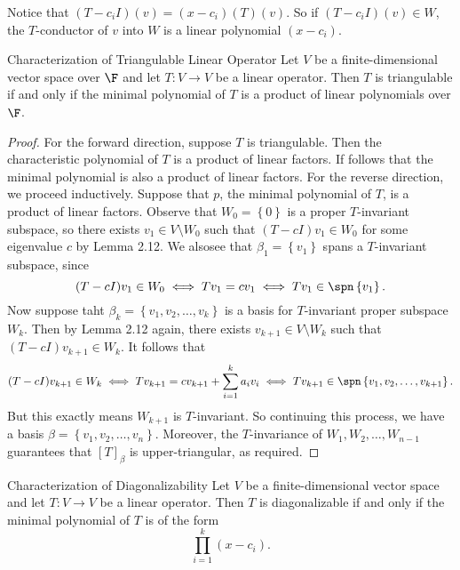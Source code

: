 \documentclass[math_245.tex]{subfiles}
\begin{document}
    \begin{remark}
        Notice that $(T-c_iI)(v) = (x-c_i)(T)(v)$. So if $(T-c_iI)(v)\in W$, the $T$-conductor of $v$ into $W$ is a linear polynomial $(x-c_i)$.
    \end{remark}

    \begin{theorem}{Characterization of Triangulable Linear Operator}
        Let $V$ be a finite-dimensional vector space over $\F$ and let $T:V\to V$ be a linear operator. Then $T$ is triangulable if and only if the minimal polynomial of $T$ is a product of linear polynomials over $\F$.
    \end{theorem}

    \begin{proof}
        For the forward direction, suppose $T$ is triangulable. Then the characteristic polynomial of $T$ is a product of linear factors. If follows that the minimal polynomial is also a product of linear factors. For the reverse direction, we proceed inductively. Suppose that $p$, the minimal polynomial of $T$, is a product of linear factors. Observe that $W_0 = \left\lbrace 0 \right\rbrace$ is a proper $T$-invariant subspace, so there exists $v_1\in V\setminus W_0$ such that $(T-cI)v_1\in
        W_0$ for some eigenvalue $c$ by Lemma 2.12. We alsosee that $\beta_1 = \left\lbrace v_1 \right\rbrace$ spans a $T$-invariant subspace, since
        \begin{equation*}
            (T-cI)v_1\in W_0 \iff Tv_1 = cv_1 \iff Tv_1\in \spn \left\lbrace v_1 \right\rbrace.
        \end{equation*}
        Now suppose taht $\beta_k = \left\lbrace v_1, v_2, \ldots, v_k \right\rbrace$ is a basis for $T$-invariant proper subspace $W_k$. Then by Lemma 2.12 again, there exists $v_{k+1}\in V\setminus W_k$ such that $(T-cI)v_{k+1}\in W_k$. It follows that
        \begin{equation*}
            (T-cI)v_{k+1}\in W_k \iff Tv_{k+1} = cv_{k+1} + \sum^{k}_{i=1} a_iv_i  \iff Tv_{k+1}\in \spn \left\lbrace v_1, v_2, \ldots, v_{k+1} \right\rbrace.
        \end{equation*}
        But this exactly means $W_{k+1}$ is $T$-invariant. So continuing this process, we have a basis $\beta = \left\lbrace v_1, v_2, \ldots, v_n \right\rbrace$. Moreover, the $T$-invariance of $W_1, W_2, \ldots, W_{n-1}$ guarantees that $[T]_\beta$ is upper-triangular, as required.
    \end{proof}

    \begin{theorem}{Characterization of Diagonalizability}
        Let $V$ be a finite-dimensional vector space and let $T:V\to V$ be a linear operator. Then $T$ is diagonalizable if and only if the minimal polynomial of $T$ is of the form
        \begin{equation*}
            \prod^{k}_{i=1} (x-c_i).
        \end{equation*}
    \end{theorem}
\end{document}
